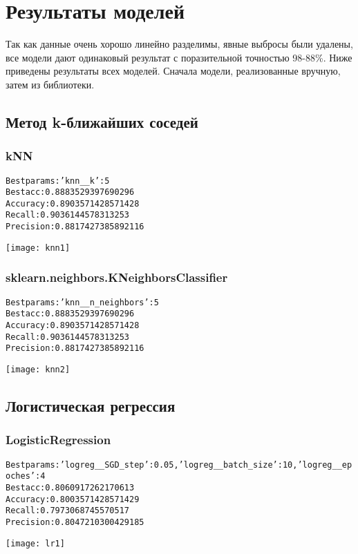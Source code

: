  
\graphicspath{{png/}}
\section{Результаты моделей}
Так как данные очень хорошо линейно разделимы, явные выбросы были удалены, все модели дают одинаковый результат с поразительной точностью 98-88\%. 
Ниже приведены результаты всех моделей. Сначала модели, реализованные вручную, затем из библиотеки.

\subsection{Метод k-ближайших соседей}
\subsubsection{kNN}
\begin{alltt}
Best params: {'knn__k': 5}
Best acc: 0.8883529397690296
Accuracy: 0.8903571428571428
Recall: 0.9036144578313253
Precision: 0.8817427385892116
\end{alltt}
\begin{center}
\texttt{[image: knn1]}
\end{center}
\pagebreak

\subsubsection{sklearn.neighbors.KNeighborsClassifier}
\begin{alltt}
Best params: {'knn__n_neighbors': 5}
Best acc: 0.8883529397690296
Accuracy: 0.8903571428571428
Recall: 0.9036144578313253
Precision: 0.8817427385892116
\end{alltt}
\begin{center}
\texttt{[image: knn2]}
\end{center}
\pagebreak

\subsection{Логистическая регрессия}
\subsubsection{LogisticRegression}
\begin{alltt}
Best params: {'logreg__SGD_step': 0.05, 'logreg__batch_size': 10, 'logreg__epoches': 4}
Best acc: 0.8060917262170613
Accuracy: 0.8003571428571429
Recall: 0.7973068745570517
Precision: 0.8047210300429185
\end{alltt}
\begin{center}
\texttt{[image: lr1]}
\end{center}

